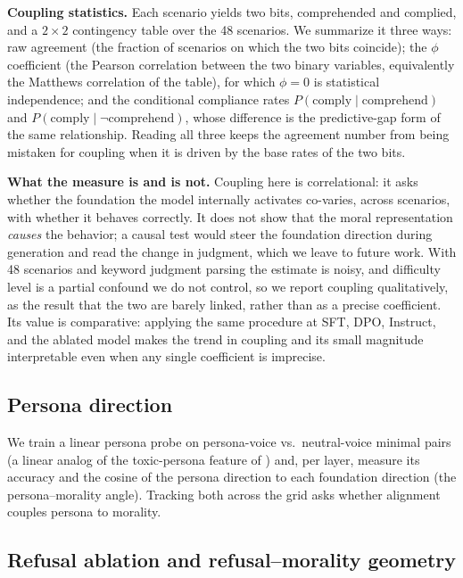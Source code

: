 \textbf{Coupling statistics.} Each scenario yields two bits, comprehended and
complied, and a \(2\times2\) contingency table over the 48 scenarios. We summarize
it three ways: raw agreement (the fraction of scenarios on which the two bits
coincide); the \(\phi\) coefficient (the Pearson correlation between the two binary
variables, equivalently the Matthews correlation of the table), for which
\(\phi = 0\) is statistical independence; and the conditional compliance rates
\(P(\text{comply}\mid\text{comprehend})\) and
\(P(\text{comply}\mid\neg\text{comprehend})\), whose difference is the
predictive-gap form of the same relationship. Reading all three keeps the
agreement number from being mistaken for coupling when it is driven by the base
rates of the two bits.

\textbf{What the measure is and is not.} Coupling here is correlational: it asks
whether the foundation the model internally activates co-varies, across
scenarios, with whether it behaves correctly. It does not show that the moral
representation \emph{causes} the behavior; a causal test would steer the
foundation direction during generation and read the change in judgment, which we
leave to future work. With 48 scenarios and keyword judgment parsing the estimate
is noisy, and difficulty level is a partial confound we do not control, so we
report coupling qualitatively, as the result that the two are barely linked,
rather than as a precise coefficient. Its value is comparative: applying the
same procedure at SFT, DPO, Instruct, and the ablated model makes the trend in
coupling and its small magnitude interpretable even when any single coefficient
is imprecise.

\subsection{Persona direction}\label{persona-direction}

We train a linear persona probe on persona-voice vs.~neutral-voice minimal
pairs (a linear analog of the toxic-persona feature of
\citealp{wang2025persona}) and, per layer, measure its accuracy and the cosine
of the persona direction to each foundation direction (the persona--morality
angle). Tracking both across the grid asks whether alignment couples persona to
morality.

\subsection{Refusal ablation and refusal--morality geometry}\label{refusal-ablation-and-refusalmorality-geometry}

